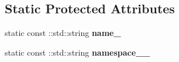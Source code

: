 \subsection*{Static Protected Attributes}
\begin{DoxyCompactItemize}
\item 
\hypertarget{classopenstack_1_1xml_1_1BackupOrResizeInProgress_a50e67056f998ad4c4b11bad6e9803b13}{
static const ::std::string {\bfseries name\_\-}}
\label{classopenstack_1_1xml_1_1BackupOrResizeInProgress_a50e67056f998ad4c4b11bad6e9803b13}

\item 
\hypertarget{classopenstack_1_1xml_1_1BackupOrResizeInProgress_a6be2a3bcffd5c31cc28f9c41caa883cd}{
static const ::std::string {\bfseries namespace\_\-\_\-}}
\label{classopenstack_1_1xml_1_1BackupOrResizeInProgress_a6be2a3bcffd5c31cc28f9c41caa883cd}

\end{DoxyCompactItemize}
